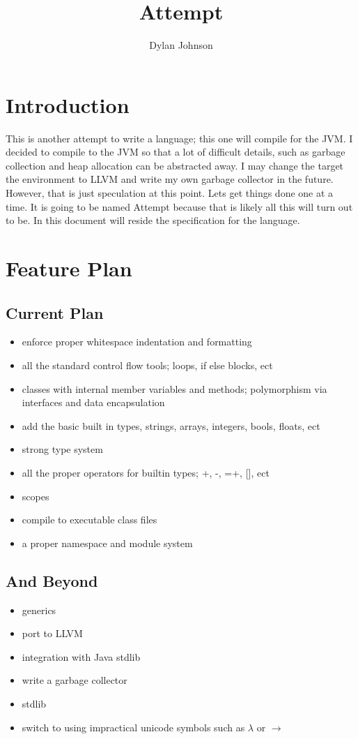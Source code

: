 \documentclass{article}
\author{Dylan Johnson}
\title{Attempt}
\newcommand{\centersec}[1]{\section*{\hfil #1 \hfil}}
\newcommand{\subcentersec}[1]{\subsection*{\hfil #1 \hfil}}
\begin{document}
  \maketitle

  \centersec{Introduction}
    This is another attempt to write a language; this one will compile for the JVM. I decided to compile
    to the JVM so that a lot of difficult details, such as garbage collection and heap allocation
    can be abstracted away. I may change the target the environment to LLVM and write my own garbage
    collector in the future. However, that is just speculation at this point. Lets get things done one
    at a time. It is going to be named Attempt because that is likely all this will turn out to be.
    In this document will reside the specification for the language.

  \centersec{Feature Plan}
    \subcentersec{Current Plan}
      \begin{itemize}
        \item{enforce proper whitespace indentation and formatting}
        \item{all the standard control flow tools; loops, if else blocks, ect}
        \item{classes with internal member variables and methods; polymorphism via interfaces and data encapsulation}
        \item{add the basic built in types, strings, arrays, integers, bools, floats, ect}
        \item{strong type system}
        \item{all the proper operators for builtin types; +, -, =+, [], ect}
        \item{scopes}
        \item{compile to executable class files}
        \item{a proper namespace and module system}
      \end{itemize}

    \subcentersec{And Beyond}
      \begin{itemize}
        \item{generics}
        \item{port to LLVM}
        \item{integration with Java stdlib}
        \item{write a garbage collector}
        \item{stdlib}
        \item{switch to using impractical unicode symbols such as $ \lambda $ or $ \rightarrow $}
      \end{itemize}
\end{document}
